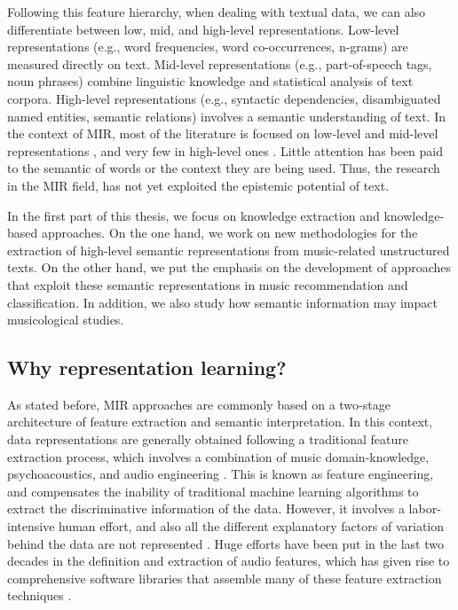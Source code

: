 Following this feature hierarchy, when dealing with textual data, we can also differentiate between low, mid, and high-level representations. Low-level representations (e.g., word frequencies, word co-occurrences, n-grams) are measured directly on text. Mid-level representations (e.g., part-of-speech tags, noun phrases) combine linguistic knowledge and statistical analysis of text corpora. High-level representations (e.g., syntactic dependencies, disambiguated named entities, semantic relations) involves a semantic understanding of text. In the context of MIR, most of the literature is focused on low-level and mid-level representations \citep{Celma2006,lamere2008social,Whitman2002,Knees2013}, and very few in high-level ones \citep{Tata2010,Knees2011,Sordo2012}. Little attention has been paid to the semantic of words or the context they are being used. Thus, the research in the MIR field, has not yet exploited the epistemic potential of text.

In the first part of this thesis, we focus on knowledge extraction and knowledge-based approaches. On the one hand, we work on new methodologies for the extraction of high-level semantic representations from music-related unstructured texts. On the other hand, we put the emphasis on the development of approaches that exploit these semantic representations in music recommendation and classification. In addition, we also study how semantic information may impact musicological studies.

\subsection{Why representation learning?}
\label{sec:intro:learning}

As stated before, MIR approaches are commonly based on a two-stage architecture of feature extraction and semantic interpretation. In this context, data representations are generally obtained following a traditional feature extraction process, which involves a combination of music domain-knowledge, psychoacoustics, and audio engineering \citep{humphrey2012}. 
This is known as feature engineering, and compensates the inability of traditional machine learning algorithms to extract the discriminative information of the data. However, it involves a labor-intensive human effort, and also all the different explanatory factors of variation behind the data are not represented \citep{bengio2013representation}. 
Huge efforts have been put in the last two decades in the definition and extraction of audio features, which has given rise to comprehensive software libraries that assemble many of these feature extraction techniques \citep{Bogdanov2013, Mcfee2015}. 

